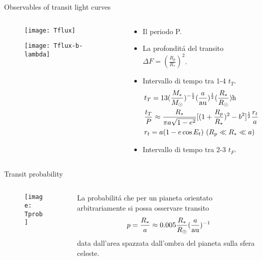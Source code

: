 \begin{frame}{Observables of transit light curves}
\begin{columns}[c]\begin{column}{0.4\textwidth}
\begin{figure}[!ht]\texttt{[image: Tflux]}\label{fig:Tflux}\end{figure}
\begin{figure}[!ht]\texttt{[image: Tflux-b-lambda]}\label{fig:Tflux-b-lambda}\end{figure}
\end{column}
\begin{column}{0.6\textwidth}
\begin{itemize}
    \item Il periodo P.
    \item La profondit\'a del transito $\Delta F=(\frac{R_p}{R_*})^2$.
    \item Intervallo di tempo tra 1-4 $t_T$.
    \begin{align*}
    &t_T=13(\frac{M_*}{\msun{}})\expy{-\frac{1}{2}}(\frac{a}{\si{\astronomicalunit}})\expy{\frac{1}{2}}(\frac{R_*}{\rsun{}})\si{\hour}\\
    &\frac{t_T}{P}\approx\frac{R_*}{\pi a\sqrt{1-e^2}}[(1+\frac{R_p}{R_*})^2-b^2]^{\frac{1}{2}}\frac{r_t}{a}\\
    &r_t=a(1-e\cos{E_t})\ (R_p\ll R_*\ll a)
    \end{align*}
    \item Intervallo di tempo tra 2-3 $t_F$.
\end{itemize}
\end{column}\end{columns}
\end{frame}

\begin{frame}{Transit probability}
\begin{columns}  \begin{column}{0.3\textwidth}
\begin{figure}[!ht]\texttt{[image: Tprob]}\label{fig:Tprob}\end{figure}
\end{column}
\begin{column}{0.7\textwidth}
La probabilit\'a che per un pianeta orientato arbitrariamente si possa osservare transito
\begin{equation*}
p=\frac{R_*}{a}\approx0.005\frac{R_*}{\rsun{}}(\frac{a}{\si{\astronomicalunit}})\expy{-1}
\end{equation*}
data dall'area spazzata dall'ombra del pianeta sulla sfera celeste.
\end{column}  \end{columns}
\end{frame}

